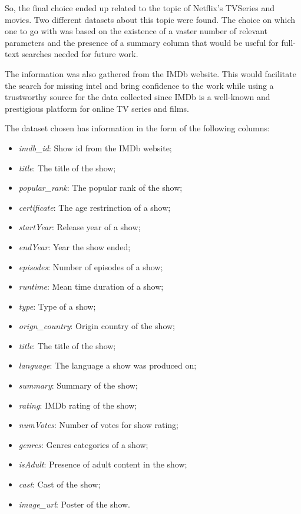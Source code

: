 \documentclass[sigplan,screen]{acmart}
\begin{document}
So, the final choice ended up related to the topic of Netflix's TVSeries and movies. Two different datasets about this topic were found. The choice on which one to go with was based on the existence of a vaster number of relevant parameters and the presence of a summary column that would be useful for full-text searches needed for future work.

The information was also gathered from the IMDb website. This would facilitate the search for missing intel and bring confidence to the work while using a trustworthy source for the data collected since IMDb is a well-known and prestigious platform for online TV series and films.

The dataset chosen has information in the form of the following columns:

\begin{itemize}
\item {\textit{imdb\_id}}: Show id from the IMDb website;
\item {\textit{title}}: The title of the show;
\item {\textit{popular\_rank}}: The popular rank of the show;
\item {\textit{certificate}}: The age restrinction of a show;
\item {\textit{startYear}}: Release year of a show;
\item {\textit{endYear}}: Year the show ended;
\item {\textit{episodes}}: Number of episodes of a show;
\item {\textit{runtime}}: Mean time duration of a show;
\item {\textit{type}}: Type of a show;
\item {\textit{orign\_country}}: Origin country of the show;
\item {\textit{title}}: The title of the show;
\item {\textit{language}}: The language a show was produced on;
\item {\textit{summary}}: Summary of the show;
\item {\textit{rating}}: IMDb rating of the show;
\item {\textit{numVotes}}: Number of votes for show rating;
\item {\textit{genres}}: Genres categories of a show;
\item {\textit{isAdult}}: Presence of adult content in the show;
\item {\textit{cast}}: Cast of the show;
\item {\textit{image\_url}}: Poster of the show.
\end{itemize}
\end{document}
